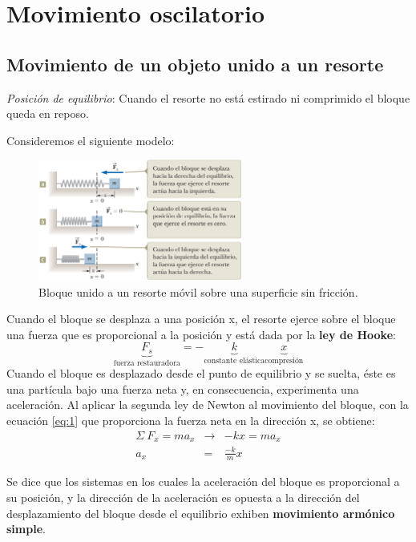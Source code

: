 \section{Movimiento oscilatorio}
  \subsection{Movimiento de un objeto unido a un resorte}
    \PN \textit{Posición de equilibrio}: Cuando el resorte no está estirado ni comprimido el bloque queda en reposo.

    \vspace{3mm}
    \PN Consideremos el siguiente modelo:

    \begin{figure}[H]
    \centering
      \includegraphics[width=0.6\textwidth]{2/figure_1}
      \caption{Bloque unido a un resorte móvil sobre una superficie sin fricción.}
    \end{figure}

    \PN Cuando el bloque se desplaza a una posición x, el resorte ejerce sobre el bloque una fuerza que es proporcional a
    la posición y está dada por la \textbf{ley de Hooke}:
    \begin{equation}\label{eq:1}
      \underbrace{F_{s}}_{\text{fuerza restauradora}} = -\underbrace{k}_{\text{constante elástica}}\underbrace{x}_{\text{compresión}}
    \end{equation}
    \PN Cuando el bloque es desplazado desde el punto de equilibrio y se suelta, éste es una partícula bajo una fuerza
    neta y, en consecuencia, experimenta una aceleración. Al aplicar la segunda ley de Newton al movimiento del bloque,
    con la ecuación \ref{eq:1} que proporciona la fuerza neta en la dirección x, se obtiene:
    \begin{eqnarray*}
      \Sigma \ F_{x} = ma_{x} &\rightarrow& -kx = ma_{x} \\
      a_{x} &=& \frac{-k}{m}x
    \end{eqnarray*}

    \PN Se dice que los sistemas en los cuales la aceleración del bloque es proporcional a su posición, y la dirección de
    la aceleración es opuesta a la dirección del desplazamiento del bloque desde el equilibrio exhiben \textbf{movimiento
    armónico simple}.

